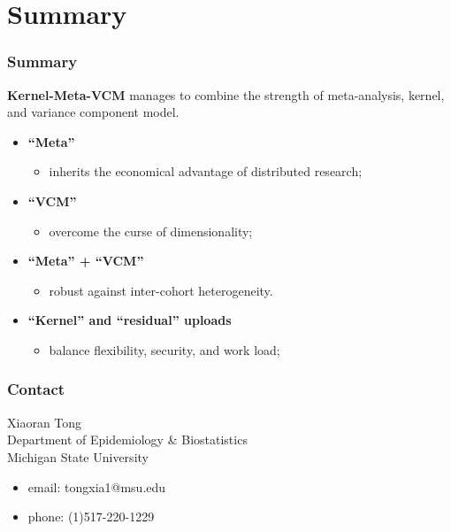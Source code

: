 \documentclass{beamer}
\begin{document}
\section{Summary}
\begin{frame} %
  \frametitle{Summary} %
  \textbf{Kernel-Meta-VCM} manages to combine the strength of
  meta-analysis, kernel, and variance component model.
  \begin{itemize}
  \item \textbf{``Meta''}
    \begin{itemize}
    \item inherits the economical advantage of distributed research;
    \end{itemize}
  \item \textbf{``VCM''}
    \begin{itemize}
    \item overcome the curse of dimensionality;
    \end{itemize}
  \item \textbf{``Meta'' + ``VCM''}
    \begin{itemize}
    \item robust against inter-cohort heterogeneity.
    \end{itemize}
  \item \textbf{``Kernel'' and ``residual'' uploads}
    \begin{itemize}
    \item balance flexibility, security, and work load;
    \end{itemize}
  \end{itemize}
\end{frame}
\begin{frame} %
  \frametitle{Contact} %
  Xiaoran Tong \\
  Department of Epidemiology \& Biostatistics \\
  Michigan State University
  \begin{itemize}
  \item email: tongxia1@msu.edu
  \item phone: (1)517-220-1229
  \end{itemize}
\end{frame}
\end{document}
